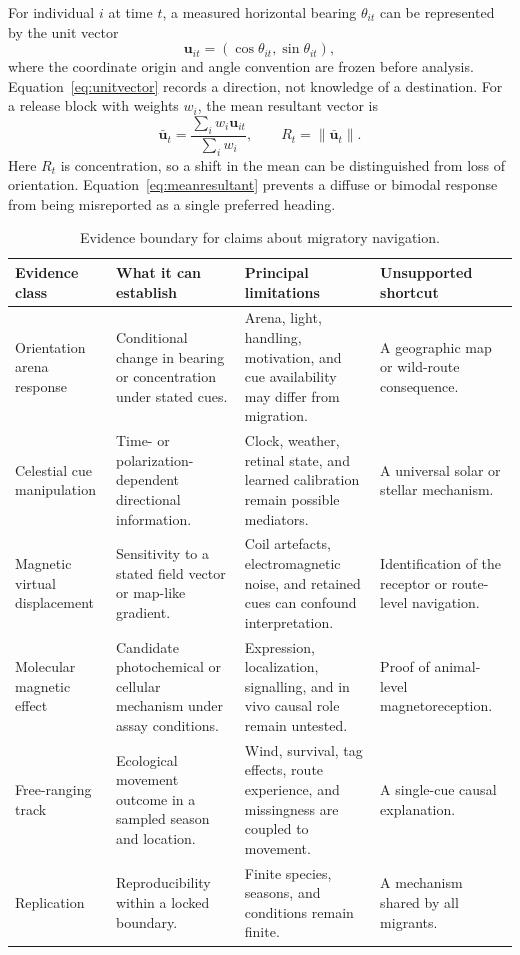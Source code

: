 \documentclass[conference]{IEEEtran}
\begin{document}
For individual $i$ at time $t$, a measured horizontal bearing $\theta_{it}$ can be represented by the unit vector
\begin{equation}
\mathbf{u}_{it}=\left(\cos\theta_{it},\sin\theta_{it}\right),
\label{eq:unitvector}
\end{equation}
where the coordinate origin and angle convention are frozen before analysis. Equation~\eqref{eq:unitvector} records a direction, not knowledge of a destination. For a release block with weights $w_i$, the mean resultant vector is
\begin{equation}
\bar{\mathbf{u}}_t=\frac{\sum_i w_i\mathbf{u}_{it}}{\sum_i w_i},\qquad R_t=\lVert\bar{\mathbf{u}}_t\rVert .
\label{eq:meanresultant}
\end{equation}
Here $R_t$ is concentration, so a shift in the mean can be distinguished from loss of orientation. Equation~\eqref{eq:meanresultant} prevents a diffuse or bimodal response from being misreported as a single preferred heading.

\begin{table}[!t]
\caption{Evidence boundary for claims about migratory navigation.}\label{tab:boundary}\centering\footnotesize
\begin{tabular}{@{}L{.19\textwidth}L{.25\textwidth}L{.27\textwidth}L{.21\textwidth}@{}}\toprule
Evidence class & What it can establish & Principal limitations & Unsupported shortcut\\\midrule
Orientation arena response & Conditional change in bearing or concentration under stated cues. & Arena, light, handling, motivation, and cue availability may differ from migration. & A geographic map or wild-route consequence.\\
Celestial cue manipulation & Time- or polarization-dependent directional information. & Clock, weather, retinal state, and learned calibration remain possible mediators. & A universal solar or stellar mechanism.\\
Magnetic virtual displacement & Sensitivity to a stated field vector or map-like gradient. & Coil artefacts, electromagnetic noise, and retained cues can confound interpretation. & Identification of the receptor or route-level navigation.\\
Molecular magnetic effect & Candidate photochemical or cellular mechanism under assay conditions. & Expression, localization, signalling, and in vivo causal role remain untested. & Proof of animal-level magnetoreception.\\
Free-ranging track & Ecological movement outcome in a sampled season and location. & Wind, survival, tag effects, route experience, and missingness are coupled to movement. & A single-cue causal explanation.\\
Replication & Reproducibility within a locked boundary. & Finite species, seasons, and conditions remain finite. & A mechanism shared by all migrants.\\\bottomrule
\end{tabular}
\end{table}
\end{document}
